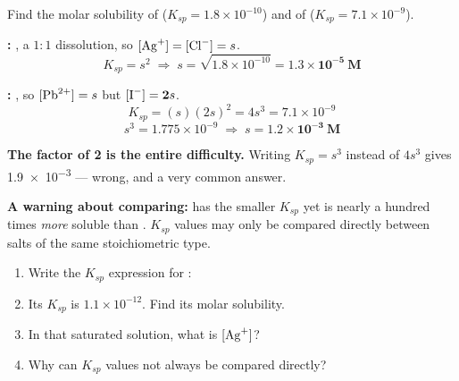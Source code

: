 \documentclass{apchem-worksheet}
\begin{document}
\begin{workedexample}
Find the molar solubility of 
($K_{sp} = 1.8\times10^{-10}$) and of 
($K_{sp} = 7.1\times10^{-9}$).

\textbf{:} , a $1:1$ dissolution, so
$[\ce{Ag+}] = [\ce{Cl-}] = s$.
\[ K_{sp} = s^2 \;\Rightarrow\; s = \sqrt{1.8\times10^{-10}}
   = \mathbf{1.3\times10^{-5}~M} \]

\textbf{:} , so
$[\ce{Pb^2+}] = s$ but $[\ce{I-}] = \mathbf{2}s$.
\[ K_{sp} = (s)(2s)^2 = 4s^3 = 7.1\times10^{-9} \]
\[ s^3 = 1.775\times10^{-9} \;\Rightarrow\;
   s = \mathbf{1.2\times10^{-3}~M} \]

\textbf{The factor of 2 is the entire difficulty.} Writing
$K_{sp} = s^3$ instead of $4s^3$ gives \num{1.9e-3} --- wrong, and a very
common answer.

\textbf{A warning about comparing:}  has the smaller $K_{sp}$ yet
is nearly a hundred times \emph{more} soluble than . $K_{sp}$
values may only be compared directly between salts of the same
stoichiometric type.
\end{workedexample}

\begin{yourturn}
\begin{enumerate}[leftmargin=*,itemsep=0.5em]
  \item Write the $K_{sp}$ expression for :
        \workspace[1.6cm]
  \item Its $K_{sp}$ is $1.1\times10^{-12}$. Find its molar solubility.
        \workspace[2.0cm]
  \item In that saturated solution, what is $[\ce{Ag+}]$?
        \workspace[1.4cm]
  \item Why can $K_{sp}$ values not always be compared directly?
        \workspace[1.8cm]
\end{enumerate}
\end{yourturn}
\end{document}
